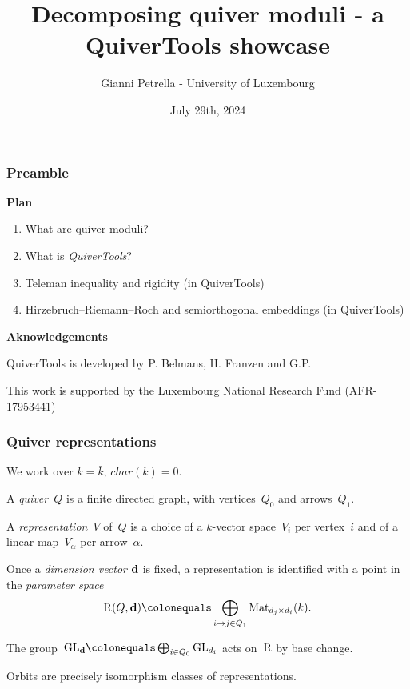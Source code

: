 \documentclass{beamer}
\title{Decomposing quiver moduli - a QuiverTools showcase}
\author{Gianni Petrella - University of Luxembourg}
\institute{MEGA 2024 - MPI MIS Leipzig}
\date{July 29th, 2024}
\begin{document}
\begin{frame}
    \titlepage
\end{frame}

\begin{frame}
    \frametitle{Preamble}
\textbf{Plan}
\begin{enumerate}
    \item What are quiver moduli?
    \item What is \emph{QuiverTools}?
    \item Teleman inequality and rigidity (in QuiverTools)
    \item Hirzebruch--Riemann--Roch and semiorthogonal embeddings (in QuiverTools)
\end{enumerate} \pause
\vfill
\textbf{Aknowledgements}

QuiverTools is developed by P. Belmans, H. Franzen and G.P.

This work is supported by the Luxembourg National Research Fund (AFR-17953441)

\end{frame}

\begin{frame}
    \frametitle{Quiver representations}
\begin{definition}
    We work over $k = \bar{k}$, $char(k) = 0$. \pause

    A \emph{quiver}~$Q$ is a finite directed graph, with
    vertices~$Q_0$ and arrows~$Q_1$.

    A \emph{representation}~$V$ of~$Q$ is
    a choice of a $k$-vector space~$V_i$ per vertex~$i$
    and of a linear map~$V_{\alpha}$ per arrow~$\alpha$.
\end{definition} \pause

Once a \emph{dimension vector} $\mathbf{d}$ is fixed, a representation
is identified with a point in the \emph{parameter space}
\[
    \parameterspace(Q, \tuple{d})
    \colonequals \bigoplus_{i \to j \in Q_1}
    \Mat_{d_j \times d_i}(k).
\] \pause

The group~${\GL}_{\tuple{d}} \colonequals \bigoplus_{i \in Q_0} \GL_{d_i}$
acts on~$\operatorname{R}$ by base change. \pause

Orbits are precisely isomorphism classes of representations.
\end{frame}
\end{document}
